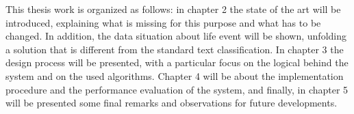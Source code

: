 This thesis work is organized as follows: in chapter 2 the state of the art will be introduced, explaining what is missing for this purpose and what has to be changed. In addition, the data situation about life event will be shown, unfolding a solution that is different from the standard text classification. In chapter 3 the design process will be presented, with a particular focus on the logical behind the system and on the used algorithms. Chapter 4 will be about the implementation procedure and the performance evaluation of the system, and finally, in chapter 5 will be presented
some final remarks and observations for future developments.

